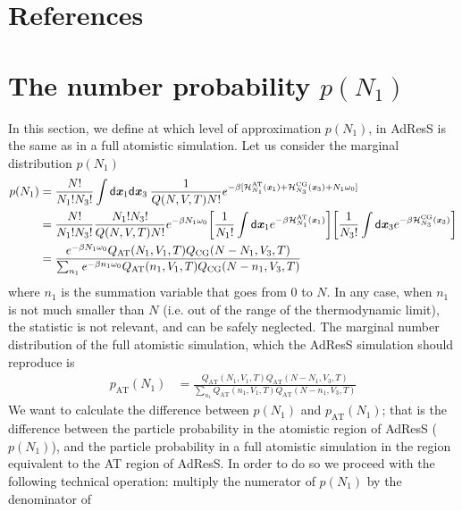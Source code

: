 \documentclass[aip,jcp,a4paper,reprint,onecolumn]{revtex4-1}
\newcommand{\vect}[1]{\textbf{\textit{#1}}}
\newcommand{\dd}[1]{\textsf{#1}}
\newcommand{\AT}{{\textrm{{AT}}}}
\newcommand{\CG}{{\textrm{CG}}}
\begin{document}
\section*{References}
{}



\appendix

\section{The number probability $p(N_1)$}\label{app:2}
In this section, we define at which level of approximation $p(N_{1})$, in AdResS is the same as in a full atomistic simulation. 
Let us consider the marginal distribution $p(N_1)$
\begin{align}\nonumber
  p(N_1)
  &=
  \frac{N!}{N_1!N_3!}
  \int
  \dd d\vect x_1\dd d\vect x_3  \:
  \frac{1}{Q(N,V,T) N!}
  e^{-\beta
    [\mathcal H_{N_1}^{\AT}(\vect x_1) +
    \mathcal H_{N_3}^{\CG}(\vect x_3) +
    N_1\omega_0]}\\\nonumber
  &=
  \frac{N!}{N_1!N_3!}
  \frac{N_1!N_3!}{Q(N,V,T) N!}
  e^{-\beta N_1\omega_0}
  \bigg[
  \frac1{N_1!}
  \int
  \dd d\vect x_1
  e^{-\beta \mathcal H_{N_1}^{\AT}(\vect x_1)}
  \bigg]
  \bigg[
  \frac1{N_3!}
  \int
  \dd d\vect x_3
  e^{-\beta \mathcal H_{N_3}^{\CG}(\vect x_3)}
  \bigg]  \\\label{eqn:pn1}
  &=
  \frac
  {
    e^{-\beta N_1\omega_0}
    Q_{\AT}(N_1,V_1,T) Q_{\CG}(N-N_1,V_3,T)
  }
  {
    \sum_{n_1}
    e^{-\beta n_1\omega_0}
    Q_{\AT}(n_1,V_1,T) Q_{\CG}(N-n_1,V_3,T)
  }
\end{align}
where $n_1$ is the summation variable that goes from 0 to $N$.
In any case, when $n_1$ is not much smaller than $N$ (i.e. out of the range of the
thermodynamic limit), the statistic is not relevant,
and can be safely neglected.
The marginal number distribution of the full atomistic simulation,
which the AdResS simulation should
reproduce is
\begin{align}
  p_{\AT}(N_1)
  &=
  \frac
  {
    Q_{\AT}(N_1,V_1,T) Q_{\AT}(N-N_1,V_3,T)
  }
  {
    \sum_{n_1}
    Q_{\AT}(n_1,V_1,T) Q_{\AT}(N-n_1,V_3,T)
  }  
\end{align}
We want to calculate the difference between $p(N_1)$ and $p_{\AT}(N_1)$; that is the difference between the particle probability in the atomistic region of AdResS ($p(N_{1})$), and the particle probability in a full atomistic simulation in the region equivalent to the AT region of AdResS.
In order to do so we proceed with the following technical operation: multiply the numerator of $p(N_1)$ by the denominator of
\end{document}

